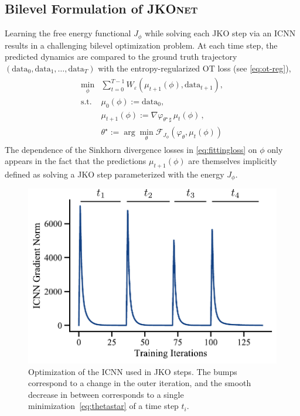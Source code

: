 \subsection{Bilevel Formulation of \textsc{JKOnet}}
Learning the free energy functional $J_\phi$ while solving each \acrshort{JKO} step via an \acrshort{ICNN} results in a challenging bilevel optimization problem.
At each time step, the predicted dynamics are compared to the ground truth trajectory $(\mathrm{data}_0, \mathrm{data}_1, \dots, \mathrm{data}_T)$ with the entropy-regularized OT loss (see \ref{eq:ot-reg}),
\begin{align} \label{eq:fittingloss}
\begin{split}
    \min_\phi & \sum_{t=0}^{T-1} W_\varepsilon(\mu_{t+1}(\phi), \mathrm{data}_{t+1}), \\
    \text{s.t. } & \mu_{0}(\phi) := \mathrm{data}_0, \\
      & \mu_{t+1}(\phi) := \nabla \varphi_{\theta^\star\, \sharp}\, \mu_{t}(\phi)\,, \\
      & \theta^\star:=\arg \min_{\theta} \mathcal{F}_{J_{\phi}}(\varphi_{\theta},\mu_t(\phi))
\end{split}
\end{align}
The dependence of the Sinkhorn divergence losses in \eqref{eq:fittingloss} on $\phi$ only appears in the fact that the predictions $\mu_{t+1}(\phi)$ are themselves implicitly defined as solving a \acrshort{JKO} step parameterized with the energy $J_\phi$. 

\begin{figure}[t]
    \centering
    \includegraphics[width=.6\textwidth]{figures/fig_optimization_icnn.pdf}
    \caption{Optimization of the \acrshort{ICNN} used in \acrshort{JKO} steps. The bumps correspond to a change in the outer iteration, and the smooth decrease in between corresponds to a single minimization~\eqref{eq:thetastar} of a time step $t_i$.}
    \label{fig:training_icnn}
\end{figure}

